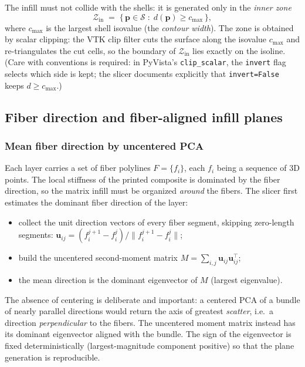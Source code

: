 The infill must not collide with the shells: it is generated only in
the \emph{inner zone}
\begin{equation}
  \mathcal{Z}_{\mathrm{in}} \;=\; \{\,\mathbf{p} \in \mathcal{S} \;:\; d(\mathbf{p}) \ge c_{\max}\,\},
\end{equation}
where $c_{\max}$ is the largest shell isovalue (the \emph{contour
width}). The zone is obtained by scalar clipping: the VTK clip filter
cuts the surface along the isovalue $c_{\max}$ and re-triangulates the
cut cells, so the boundary of $\mathcal{Z}_{\mathrm{in}}$ lies exactly
on the isoline. (Care with conventions is required: in PyVista's
\texttt{clip\_scalar}, the \texttt{invert} flag selects which side is
kept; the slicer documents explicitly that
\texttt{invert=False} keeps $d \ge c_{\max}$.)

\subsection{Fiber direction and fiber-aligned infill planes}
\label{sec:meth-fibers}

\subsubsection{Mean fiber direction by uncentered PCA}

Each layer carries a set of fiber polylines
$F = \{f_i\}$, each $f_i$ being a sequence of 3D points. The local
stiffness of the printed composite is dominated by the fiber
direction, so the matrix infill must be organized \emph{around} the
fibers. The slicer first estimates the dominant fiber direction of the
layer:

\begin{itemize}
  \item collect the unit direction vectors of every fiber segment,
        skipping zero-length segments:
        $\mathbf{u}_{ij} = (f_i^{j+1} - f_i^j)/\|f_i^{j+1} - f_i^j\|$;
  \item build the uncentered second-moment matrix
        $M = \sum_{i,j} \mathbf{u}_{ij}\mathbf{u}_{ij}^\top$;
  \item the mean direction is the dominant eigenvector of $M$ (largest
        eigenvalue).
\end{itemize}

The absence of centering is deliberate and important: a centered PCA
of a bundle of nearly parallel directions would return the axis of
greatest \emph{scatter}, i.e.\ a direction \emph{perpendicular} to the
fibers. The uncentered moment matrix instead has its dominant
eigenvector aligned with the bundle. The sign of the eigenvector is
fixed deterministically (largest-magnitude component positive) so that
the plane generation is reproducible.

